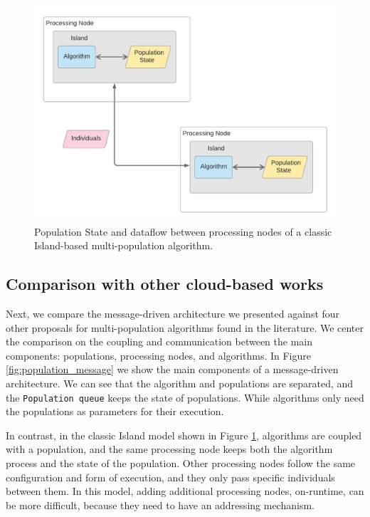 \documentclass[review]{elsarticle}
\begin{document}
\begin{figure}[ht]
    \centering
    \includegraphics[width=\textwidth]{classicisland}
    \caption{ Population State and dataflow between processing nodes of a classic Island-based multi-population algorithm. }
    \label{fig:classicisland}
\end{figure}

\subsection{Comparison with other cloud-based works} 
\label{comparison}

Next, we compare the message-driven architecture we presented against four other
proposals for multi-population algorithms found in the literature. We center the
comparison on the coupling and communication between the main components:
populations, processing nodes, and algorithms.  In Figure \ref{fig:population_message} we show the
main components of a message-driven architecture. We can see that the algorithm
and populations are separated, and the \texttt{Population queue} keeps the state
of populations. While algorithms only need the populations as parameters
for their execution.


In contrast, in the classic Island model shown in Figure
\ref{fig:classicisland}, algorithms are coupled with a population, and the same processing
node keeps both the algorithm process and the state of the population.  Other
processing nodes follow the same configuration and form of execution, and they
only pass specific individuals between them.  In this model, adding additional
processing nodes, on-runtime, can be more difficult, because they need to have
an addressing mechanism. %
\end{document}
